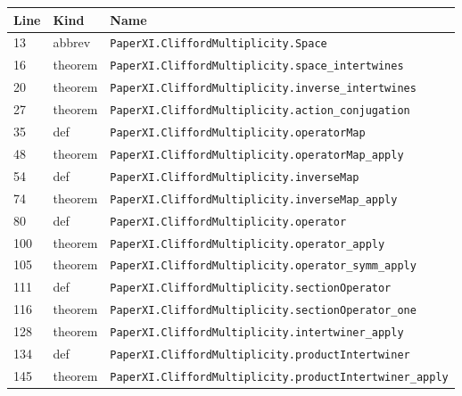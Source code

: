 \documentclass[10pt,oneside]{book}
\begin{document}
\begin{longtable}{@{}p{}p{}p{}@{}}\toprule Line&Kind&Name\\\midrule\endhead

13&abbrev&\nolinkurl{PaperXI.CliffordMultiplicity.Space}\\

16&theorem&\nolinkurl{PaperXI.CliffordMultiplicity.space_intertwines}\\

20&theorem&\nolinkurl{PaperXI.CliffordMultiplicity.inverse_intertwines}\\

27&theorem&\nolinkurl{PaperXI.CliffordMultiplicity.action_conjugation}\\

35&def&\nolinkurl{PaperXI.CliffordMultiplicity.operatorMap}\\

48&theorem&\nolinkurl{PaperXI.CliffordMultiplicity.operatorMap_apply}\\

54&def&\nolinkurl{PaperXI.CliffordMultiplicity.inverseMap}\\

74&theorem&\nolinkurl{PaperXI.CliffordMultiplicity.inverseMap_apply}\\

80&def&\nolinkurl{PaperXI.CliffordMultiplicity.operator}\\

100&theorem&\nolinkurl{PaperXI.CliffordMultiplicity.operator_apply}\\

105&theorem&\nolinkurl{PaperXI.CliffordMultiplicity.operator_symm_apply}\\

111&def&\nolinkurl{PaperXI.CliffordMultiplicity.sectionOperator}\\

116&theorem&\nolinkurl{PaperXI.CliffordMultiplicity.sectionOperator_one}\\

128&theorem&\nolinkurl{PaperXI.CliffordMultiplicity.intertwiner_apply}\\

134&def&\nolinkurl{PaperXI.CliffordMultiplicity.productIntertwiner}\\

145&theorem&\nolinkurl{PaperXI.CliffordMultiplicity.productIntertwiner_apply}\\


\end{longtable}
\end{document}
